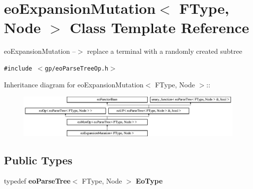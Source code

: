\section{eo\-Expansion\-Mutation$<$ FType, Node $>$ Class Template Reference}
\label{classeo_expansion_mutation}
eo\-Expansion\-Mutation --$>$ replace a terminal with a randomly created subtree  


{\tt \#include $<$gp/eo\-Parse\-Tree\-Op.h$>$}

Inheritance diagram for eo\-Expansion\-Mutation$<$ FType, Node $>$::\begin{figure}[H]
\begin{center}
\leavevmode
\includegraphics[height=2.14559cm]{classeo_expansion_mutation}
\end{center}
\end{figure}
\subsection*{Public Types}
\begin{CompactItemize}
\item 
typedef {\bf eo\-Parse\-Tree}$<$ FType, Node $>$ {\bf Eo\-Type}\label{classeo_expansion_mutation_w0}

\end{CompactItemize}
